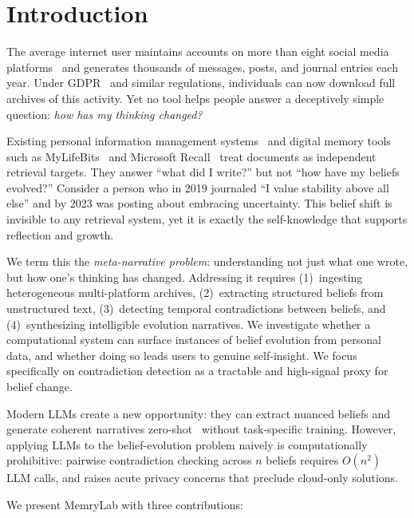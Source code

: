 \documentclass[conference]{IEEEtran}
\begin{document}
\section{Introduction}
\label{sec:intro}

The average internet user maintains accounts on more than eight social media platforms~\cite{datareportal2024} and generates thousands of messages, posts, and journal entries each year. Under GDPR~\cite{gdpr2016} and similar regulations, individuals can now download full archives of this activity. Yet no tool helps people answer a deceptively simple question: \emph{how has my thinking changed?}

Existing personal information management systems~\cite{jones2007pim,lansdale1988psychology} and digital memory tools such as MyLifeBits~\cite{gemmell2002mylifebits} and Microsoft Recall~\cite{microsoft2024recall} treat documents as independent retrieval targets. They answer ``what did I write?'' but not ``how have my beliefs evolved?'' Consider a person who in 2019 journaled ``I value stability above all else'' and by 2023 was posting about embracing uncertainty. This belief shift is invisible to any retrieval system, yet it is exactly the self-knowledge that supports reflection and growth.

We term this the \emph{meta-narrative problem}: understanding not just what one wrote, but how one's thinking has changed. Addressing it requires (1)~ingesting heterogeneous multi-platform archives, (2)~extracting structured beliefs from unstructured text, (3)~detecting temporal contradictions between beliefs, and (4)~synthesizing intelligible evolution narratives. We investigate whether a computational system can surface instances of belief evolution from personal data, and whether doing so leads users to genuine self-insight. We focus specifically on contradiction detection as a tractable and high-signal proxy for belief change.

Modern LLMs create a new opportunity: they can extract nuanced beliefs and generate coherent narratives zero-shot~\cite{brown2020gpt3,touvron2023llama} without task-specific training. However, applying LLMs to the belief-evolution problem naively is computationally prohibitive: pairwise contradiction checking across $n$ beliefs requires $O(n^2)$ LLM calls, and raises acute privacy concerns that preclude cloud-only solutions.

We present MemryLab with three contributions:
\end{document}
